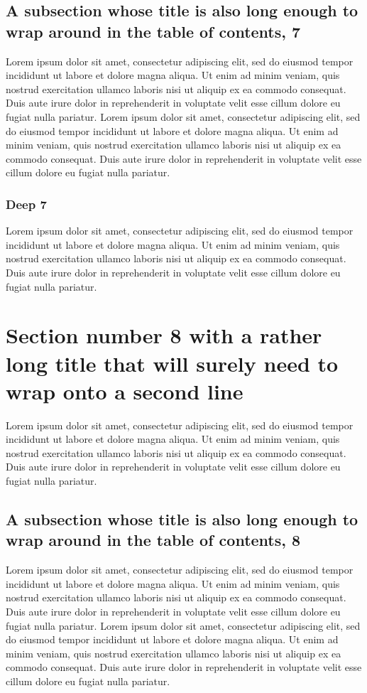 \documentclass[11pt]{article}
\begin{document}
\subsection{A subsection whose title is also long enough to wrap around in the table of contents, 7}
Lorem ipsum dolor sit amet, consectetur adipiscing elit, sed do eiusmod tempor incididunt ut labore et dolore magna aliqua. Ut enim ad minim veniam, quis nostrud exercitation ullamco laboris nisi ut aliquip ex ea commodo consequat. Duis aute irure dolor in reprehenderit in voluptate velit esse cillum dolore eu fugiat nulla pariatur. Lorem ipsum dolor sit amet, consectetur adipiscing elit, sed do eiusmod tempor incididunt ut labore et dolore magna aliqua. Ut enim ad minim veniam, quis nostrud exercitation ullamco laboris nisi ut aliquip ex ea commodo consequat. Duis aute irure dolor in reprehenderit in voluptate velit esse cillum dolore eu fugiat nulla pariatur.

\subsubsection{Deep 7}
Lorem ipsum dolor sit amet, consectetur adipiscing elit, sed do eiusmod tempor incididunt ut labore et dolore magna aliqua. Ut enim ad minim veniam, quis nostrud exercitation ullamco laboris nisi ut aliquip ex ea commodo consequat. Duis aute irure dolor in reprehenderit in voluptate velit esse cillum dolore eu fugiat nulla pariatur.

\section{Section number 8 with a rather long title that will surely need to wrap onto a second line}
Lorem ipsum dolor sit amet, consectetur adipiscing elit, sed do eiusmod tempor incididunt ut labore et dolore magna aliqua. Ut enim ad minim veniam, quis nostrud exercitation ullamco laboris nisi ut aliquip ex ea commodo consequat. Duis aute irure dolor in reprehenderit in voluptate velit esse cillum dolore eu fugiat nulla pariatur.

\subsection{A subsection whose title is also long enough to wrap around in the table of contents, 8}
Lorem ipsum dolor sit amet, consectetur adipiscing elit, sed do eiusmod tempor incididunt ut labore et dolore magna aliqua. Ut enim ad minim veniam, quis nostrud exercitation ullamco laboris nisi ut aliquip ex ea commodo consequat. Duis aute irure dolor in reprehenderit in voluptate velit esse cillum dolore eu fugiat nulla pariatur. Lorem ipsum dolor sit amet, consectetur adipiscing elit, sed do eiusmod tempor incididunt ut labore et dolore magna aliqua. Ut enim ad minim veniam, quis nostrud exercitation ullamco laboris nisi ut aliquip ex ea commodo consequat. Duis aute irure dolor in reprehenderit in voluptate velit esse cillum dolore eu fugiat nulla pariatur.
\end{document}
